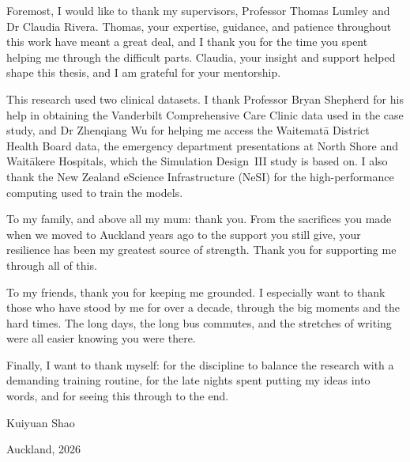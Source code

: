 \documentclass[a4paper,12pt,numbered,print]{uathesis}
\numberwithin{equation}{section}
\begin{document}
\begin{abstract}
Matching the data distribution does not measure whether the coefficient is unbiased or its interval covers. The methods are therefore evaluated against those targets directly, on three simulation designs and a clinical cohort, by the coefficient's bias and coverage, the ratio of the reported to the empirical standard error, and oracle diagnostics that separate a displaced estimate from a mis-scaled standard error.
\end{abstract}

\begin{acknowledgements}

Foremost, I would like to thank my supervisors, Professor Thomas Lumley and Dr Claudia Rivera. Thomas, your expertise, guidance, and patience throughout this work have meant a great deal, and I thank you for the time you spent helping me through the difficult parts. Claudia, your insight and support helped shape this thesis, and I am grateful for your mentorship.

This research used two clinical datasets. I thank Professor Bryan Shepherd for his help in obtaining the Vanderbilt Comprehensive Care Clinic data used in the case study, and Dr Zhenqiang Wu for helping me access the Waitemat\=a District Health Board data, the emergency department presentations at North Shore and Wait\=akere Hospitals, which the Simulation Design~III study is based on. I also thank the New Zealand eScience Infrastructure (NeSI) for the high-performance computing used to train the models.

To my family, and above all my mum: thank you. From the sacrifices you made when we moved to Auckland years ago to the support you still give, your resilience has been my greatest source of strength. Thank you for supporting me through all of this.

To my friends, thank you for keeping me grounded. I especially want to thank those who have stood by me for over a decade, through the big moments and the hard times. The long days, the long bus commutes, and the stretches of writing were all easier knowing you were there.

Finally, I want to thank myself: for the discipline to balance the research with a demanding training routine, for the late nights spent putting my ideas into words, and for seeing this through to the end.

\begin{flushright}
Kuiyuan Shao

Auckland, 2026
\end{flushright}
\end{acknowledgements}
\end{document}

